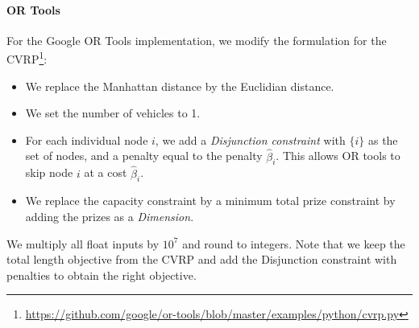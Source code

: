 \paragraph{OR Tools}
For the Google OR Tools implementation, we modify the formulation for the CVRP\footnote{\url{https://github.com/google/or-tools/blob/master/examples/python/cvrp.py}}:
\begin{itemize}
    \item We replace the Manhattan distance by the Euclidian distance.
    \item We set the number of vehicles to 1.
    \item For each individual node $i$, we add a \emph{Disjunction constraint} with $\{i\}$ as the set of nodes, and a penalty equal to the penalty $\hat{\beta}_i$. This allows OR tools to skip node $i$ at a cost $\hat{\beta}_i$.
    \item We replace the capacity constraint by a minimum total prize constraint by adding the prizes as a \emph{Dimension}.
\end{itemize}
We multiply all float inputs by $10^7$ and round to integers. Note that we keep the total length objective from the CVRP and add the Disjunction constraint with penalties to obtain the right objective.
